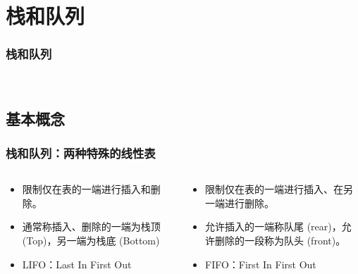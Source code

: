 \section{栈和队列}
\begin{frame}[fragile]
  \frametitle{栈和队列}
  ~
\end{frame}

\subsection{基本概念}
\begin{frame}[fragile]
  \frametitle{栈和队列：两种特殊的线性表}
  \begin{columns}
    \begin{column}[T]{0.5\linewidth}
      \begin{tcolorbox}[colframe=red!80, height=6.5cm, title=栈/Stack]
        \small
        \begin{itemize}
        \item 限制仅在表的一端进行插入和删除。
        \item 通常称插入、删除的一端为栈顶 (Top)，另一端为栈底 (Bottom)
        \item LIFO：Last In First Out
        \end{itemize}
      \end{tcolorbox}
    \end{column}
    \begin{column}[T]{0.5\linewidth}
      \begin{tcolorbox}[colframe=blue!80, height=6.5cm, title=队/Queue]
        \small
        \begin{itemize}
        \item 限制仅在表的一端进行插入、在另一端进行删除。
        \item 允许插入的一端称队尾 (rear)，允许删除的一段称为队头 (front)。
        \item FIFO：First In First Out
        \end{itemize}
      \end{tcolorbox}
    \end{column}
  \end{columns}
\end{frame}

